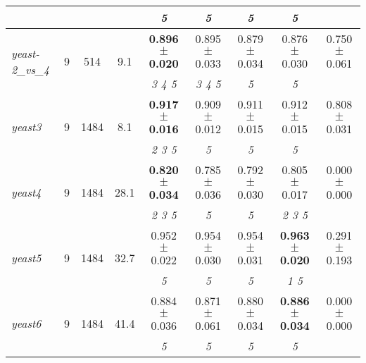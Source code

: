 \begin{table}[ht]
{\begin{tabular}{lcccccccc}
 & & &  & \textit{5 } & \textit{5 } & \textit{5 } & \textit{5 } & \textit{} \\ \bottomrule
\multirow{2}{*}{\textit{yeast-2\_vs\_4}} & \multirow{2}{*}{9} & \multirow{2}{*}{514} & \multirow{2}{*}{9.1} & \textbf{0.896 $\pm$ 0.020} & 0.895 $\pm$ 0.033 & 0.879 $\pm$ 0.034 & 0.876 $\pm$ 0.030 & 0.750 $\pm$ 0.061 \\
 & & &  & \textit{3 4 5 } & \textit{3 4 5 } & \textit{5 } & \textit{5 } & \textit{} \\ \bottomrule
\multirow{2}{*}{\textit{yeast3}} & \multirow{2}{*}{9} & \multirow{2}{*}{1484} & \multirow{2}{*}{8.1} & \textbf{0.917 $\pm$ 0.016} & 0.909 $\pm$ 0.012 & 0.911 $\pm$ 0.015 & 0.912 $\pm$ 0.015 & 0.808 $\pm$ 0.031 \\
 & & &  & \textit{2 3 5 } & \textit{5 } & \textit{5 } & \textit{5 } & \textit{} \\ \bottomrule
\multirow{2}{*}{\textit{yeast4}} & \multirow{2}{*}{9} & \multirow{2}{*}{1484} & \multirow{2}{*}{28.1} & \textbf{0.820 $\pm$ 0.034} & 0.785 $\pm$ 0.036 & 0.792 $\pm$ 0.030 & 0.805 $\pm$ 0.017 & 0.000 $\pm$ 0.000 \\
 & & &  & \textit{2 3 5 } & \textit{5 } & \textit{5 } & \textit{2 3 5 } & \textit{} \\ \bottomrule
\multirow{2}{*}{\textit{yeast5}} & \multirow{2}{*}{9} & \multirow{2}{*}{1484} & \multirow{2}{*}{32.7} & 0.952 $\pm$ 0.022 & 0.954 $\pm$ 0.030 & 0.954 $\pm$ 0.031 & \textbf{0.963 $\pm$ 0.020} & 0.291 $\pm$ 0.193 \\
 & & &  & \textit{5 } & \textit{5 } & \textit{5 } & \textit{1 5 } & \textit{} \\ \bottomrule
\multirow{2}{*}{\textit{yeast6}} & \multirow{2}{*}{9} & \multirow{2}{*}{1484} & \multirow{2}{*}{41.4} & 0.884 $\pm$ 0.036 & 0.871 $\pm$ 0.061 & 0.880 $\pm$ 0.034 & \textbf{0.886 $\pm$ 0.034} & 0.000 $\pm$ 0.000 \\
 & & &  & \textit{5 } & \textit{5 } & \textit{5 } & \textit{5 } & \textit{} \\ \bottomrule
\end{tabular}}
\end{table}